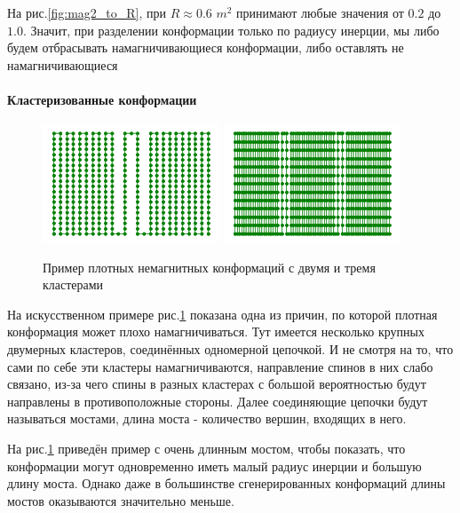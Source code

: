 На рис.\ref{fig:mag2_to_R}, при $R \approx 0.6$ $m^2$ принимают любые значения от $0.2$ до $1.0$. Значит, при разделении конформации только по радиусу инерции, мы либо будем отбрасывать намагничивающиеся конформации, либо оставлять не намагничивающиеся

\paragraph{Кластеризованные конформации}

\begin{figure}[h!]
	\centering
	\includegraphics[width=0.47\textwidth]{../images/2Cluster_conformation.png}
	\includegraphics[width=0.47\textwidth]{../images/3Cluster_conformation.png} 
	\caption{Пример плотных немагнитных конформаций с двумя и тремя кластерами}
	\label{fig:synth_cluster_conf}
\end{figure}

На искусственном примере рис.\ref{fig:synth_cluster_conf} показана одна из причин, по которой плотная конформация может плохо намагничиваться. Тут имеется несколько крупных двумерных кластеров, соединённых одномерной цепочкой. И не смотря на то, что сами по себе эти кластеры намагничиваются, направление спинов в них слабо связано, из-за чего спины в разных кластерах с большой вероятностью будут направлены в противоположные стороны. Далее соединяющие цепочки будут называться мостами, длина моста - количество вершин, входящих в него.

На рис.\ref{fig:synth_cluster_conf} приведён пример с очень длинным мостом, чтобы показать, что конформации могут одновременно иметь малый радиус инерции и большую длину моста. Однако даже в большинстве сгенерированных конформаций длины мостов оказываются значительно меньше.

